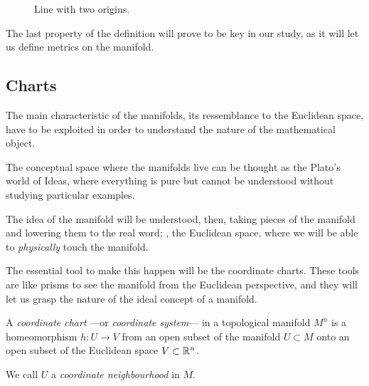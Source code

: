 \begin{figure}[bth]
    \myfloatalign
    \caption[Line with two origins]{Line with two origins.}
    \label{fig:2origin}
\end{figure}

The last property of the definition will prove to be key in our study, as it will let us define metrics on the manifold.

\subsection{Charts}


The main characteristic of the manifolds, its ressemblance to the Euclidean space, have to be exploited in order to understand the nature of the mathematical object.

The conceptual space where the manifolds live can be thought as the Plato's world of Ideas, where everything is pure but cannot be understood without studying particular examples.

The idea of the manifold will be understood, then, taking pieces of the manifold and lowering them to the real word; \ie, the Euclidean space, where we will be able to \emph{physically} touch the manifold.

The essential tool to make this happen will be the coordinate charts. These tools are like prisms to see the manifold from the Euclidean perspective, and they will let us grasp the nature of the ideal concept of a manifold.

\begin{definition}
    A \emph{coordinate chart} ---or \emph{coordinate system}--- in a topological manifold $M^n$ is a homeomorphism $h \colon U \to V$ from an open subset of the manifold $U \subset M$ onto an open subset of the Euclidean space $V \subset \mathbb{R}^n$.

    We call $U$ a \emph{coordinate neighbourhood} in $M$.
\end{definition}

